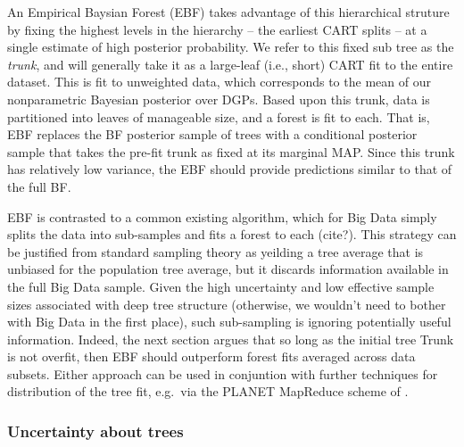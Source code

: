 \documentclass{article}
\begin{document}
An Empirical Baysian Forest (EBF) takes advantage of this hierarchical
struture by fixing the highest levels in the hierarchy -- the earliest
CART splits -- at a single estimate of high posterior probability. We
refer to this fixed sub tree as the \emph{trunk}, and will generally
take it as a large-leaf (i.e., short) CART fit to the entire dataset.
This is fit to unweighted data, which corresponds to the mean of our
nonparametric Bayesian posterior over DGPs. Based upon this trunk, data
is partitioned into leaves of manageable size, and a forest is fit to
each. That is, EBF replaces the BF posterior sample of trees with a
conditional posterior sample that takes the pre-fit trunk as fixed at
its marginal MAP. Since this trunk has relatively low variance, the EBF
should provide predictions similar to that of the full BF.

EBF is contrasted to a common existing algorithm, which for Big Data
simply splits the data into sub-samples and fits a forest to each
(cite?). This strategy can be justified from standard sampling theory as
yeilding a tree average that is unbiased for the population tree
average, but it discards information available in the full Big Data
sample. Given the high uncertainty and low effective sample sizes
associated with deep tree structure (otherwise, we wouldn't need to
bother with Big Data in the first place), such sub-sampling is ignoring
potentially useful information. Indeed, the next section argues that so
long as the initial tree Trunk is not overfit, then EBF should
outperform forest fits averaged across data subsets. Either approach can
be used in conjuntion with further techniques for distribution of the
tree fit, e.g.~via the PLANET MapReduce scheme of
\cite{panda_planet:_2009}.

    \subsubsection{Uncertainty about trees}\label{uncertainty-about-trees}
\end{document}
